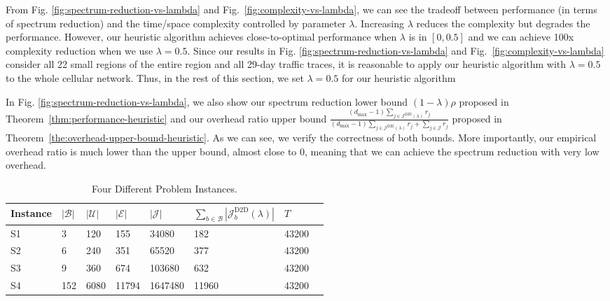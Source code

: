 From Fig. \ref{fig:spectrum-reduction-vs-lambda} and Fig.~\ref{fig:complexity-vs-lambda},
we can see the tradeoff between performance (in terms of spectrum reduction) and the time/space complexity
controlled by parameter $\lambda$. Increasing $\lambda$ reduces the complexity but degrades the performance.
However, our heuristic algorithm achieves close-to-optimal performance when $\lambda$ is in $[0,0.5]$ and we can achieve
100x complexity reduction when we use $\lambda=0.5$.
Since our results in Fig. \ref{fig:spectrum-reduction-vs-lambda} and Fig.~\ref{fig:complexity-vs-lambda}
consider all 22 small regions of the entire region and all 29-day traffic traces,
it is reasonable to apply our heuristic algorithm
with $\lambda=0.5$ to the whole cellular network.
Thus, in the rest of this section, we set $\lambda=0.5$ for our heuristic algorithm

In Fig. \ref{fig:spectrum-reduction-vs-lambda}, we also show our spectrum reduction lower bound $(1-\lambda) \rho$ proposed in Theorem~\ref{thm:performance-heuristic}
and our overhead ratio upper bound $\frac{ (d_{\max}-1) \sum_{j \in \mathcal{J}^{\textsf{D2D}  }(\lambda)} r_j }{
(d_{\max}-1) \sum_{j \in \mathcal{J}^{\textsf{D2D}  }(\lambda)} r_j + \sum_{j \in \mathcal{J}} r_j}$ proposed in
Theorem~\ref{the:overhead-upper-bound-heuristic}. As we can see, we verify the correctness of both bounds.
More importantly, our empirical overhead ratio is much lower than the upper bound, almost close to 0, meaning
that we can achieve the spectrum reduction with very low overhead.



\begin{table}[t]
	\centering
	\caption{Four Different Problem Instances.}
	\label{tab:simulation_instances}
	\begin{tabular}{|l|l|l|l|l|l|l|l|}
		\hline
		Instance           & $|\mathcal{B}|$ & $|\mathcal{U}|$ & $|\mathcal{E}|$  & $|\mathcal{J}|$ & $\sum\limits_{b\in \mathcal{B}}|\mathcal{J}_b^{\text{D2D}}(\lambda)|$   & $T$     \\ \hline
		S1                 & 3    & 120  & 155   & 34080          & 182  & 43200 \\ \hline
		S2                 & 6    & 240  & 351   & 65520          &  377  & 43200 \\ \hline
		S3                 & 9    & 360  & 674   & 103680         & 632 & 43200 \\ \hline
		S4  			   & 152  & 6080 & 11794 & 1647480        & 11960  & 43200  \\ \hline
	\end{tabular}
\end{table}

